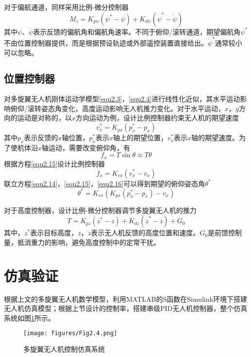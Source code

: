 对于偏航通道，同样采用比例-微分控制器
\begin{equation}
\label{equ2.13}
M_z = K_{p\psi} \left( \psi^* - \psi \right) + K_{d\psi} \left( \dot{\psi}^* -  \dot{\psi} \right)
\end{equation}
其中$\psi$、$\dot{\psi}$表示反馈的偏航角和偏航角速率。不同于俯仰/滚转通道，期望偏航角$\psi^*$不由位置控制器提供，而是根据预设轨迹或外部遥控装置直接给出。$ \dot{\psi}^*$通常较小可以忽略。

\subsection{位置控制器}
对多旋翼无人机刚体运动学模型\eqref{equ2.3}，\eqref{equ2.4}进行线性化近似，其水平运动影响俯仰/滚转姿态角变化，高度运动影响无人机推力变化。对于水平运动，$x$，$y$方向的运动是对称的，以$x$方向运动为例，设计比例控制器约束无人机的期望速度
\begin{equation}
\label{equ2.14}
v_x^* =  K_{px} \left( p_x^* - p_x \right)
\end{equation}
其中$p_x $表示反馈的$x$轴位置，$p_x^*$表示$x$轴上的期望位置，$v_x^*$表示$x$轴的期望速度。为了使机体沿$x$轴运动，需要改变俯仰角，有
\begin{equation}
\label{equ2.15}
f_x = T \sin\theta \approx T \theta
\end{equation}
根据方程\eqref{equ2.15}设计比例控制器
\begin{equation}
\label{equ2.16}
f_x = K_{vx} \left(  v_x^* - v_x \right)
\end{equation}
联立方程\eqref{equ2.14}，\eqref{equ2.15}，\eqref{equ2.16}可以得到期望的俯仰姿态角$\theta^*$
\begin{equation}
\label{equ2.17}
\theta^* = K_{vx} \left( K_{px} \left( p_x^* - p_x \right) - v_x \right)
\end{equation}

对于高度控制器，设计比例-微分控制器调节多旋翼无人机的推力
\begin{equation}
\label{equ2.18}
T = K_{pz} \left( z^* -z  \right) + K_{dz} \left( \dot{z}^* - \dot{z}  \right) + G_0
\end{equation}
其中，$z^*$表示目标高度，$z$，$\dot{z}$表示无人机反馈的高度位置和速度。$G_0$是前馈控制量，抵消重力的影响，避免高度控制中的定常干扰。

\section{仿真验证}
根据上文的多旋翼无人机数学模型，利用MATLAB的S函数在Simulink\upcite{[2.6]}环境下搭建无人机仿真模型；根据上节设计的控制率，搭建串级PID无人机控制器，整个仿真系统如图\ref{fig2.4}所示。
\begin{figure}[h]
\centering
\texttt{[image: figures/Fig2.4.png]}
\caption{多旋翼无人机控制仿真系统}
\label{fig2.4}
\end{figure}

